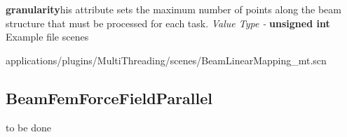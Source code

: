 \documentclass{article}
\newenvironment{componentoption}[2]%
{\textbf{#1}\newline}
\newcommand{\defaultvalue}[1] {\newline \textit{Default Value - } #1}
\newcommand{\valuetype}[1] {\newline \textit{Value Type - } \textbf{#1}}
\begin{document}


\begin{componentoption}{granularity}

This attribute sets the maximum number of points along the beam structure that must be processed for each task.
\valuetype{unsigned int}
\end{componentoption}



\subsubsection{Example file scenes}


applications/plugins/MultiThreading/scenes/BeamLinearMapping\_mt.scn\\[\baselineskip]




\subsection{BeamFemForceFieldParallel}

to be done
\end{document}
